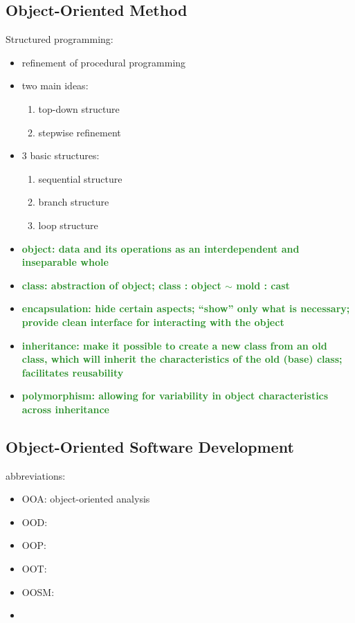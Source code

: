 \documentclass[a4paper]{article}
\newcommand{\obs}[1]{\textcolor{ForestGreen}{\textbf{#1}}}
\begin{document}
\subsection{Object-Oriented Method}
Structured programming:
\begin{itemize}
    \item refinement of procedural programming
    \item two main ideas:
    \begin{enumerate}
        \item top-down structure
        \item stepwise refinement
    \end{enumerate}
    \item 3 basic structures:
    \begin{enumerate}
        \item sequential structure
        \item branch structure
        \item loop structure
    \end{enumerate}
    \item \obs{object: data and its operations as an interdependent and inseparable whole}
    \item \obs{class: abstraction of object; class : object $\sim$ mold : cast}
    \item \obs{encapsulation: hide certain aspects; ``show'' only what is necessary;  provide clean interface for interacting with the object}
    \item \obs{inheritance: make it possible to create a new class from an old class, which will inherit the characteristics of the old (base) class; facilitates reusability}
    \item \obs{polymorphism: allowing for variability in object characteristics across inheritance}
\end{itemize}


\subsection{Object-Oriented Software Development}
abbreviations:
\begin{itemize}
    \item OOA: object-oriented analysis
    \item OOD:
    \item OOP:
    \item OOT:
    \item OOSM:
    \item
\end{itemize}
\end{document}
